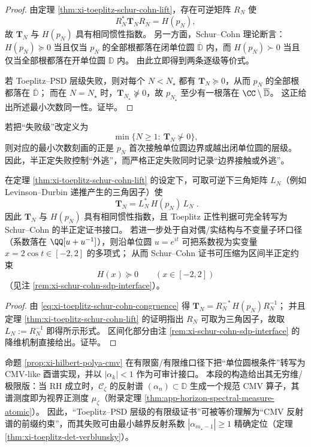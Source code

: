 \begin{proof}
由定理 \ref{thm:xi-toeplitz-schur-cohn-lift}，存在可逆矩阵 \(R_N\) 使
\[
R_N^\ast\mathbf{T}_N R_N=H(p_N),
\]
故 \(\mathbf{T}_N\) 与 \(H(p_N)\) 具有相同惯性指数。
另一方面，Schur--Cohn 理论断言：\(H(p_N)\succeq 0\) 当且仅当 \(p_N\) 的全部根都落在闭单位圆 \(\overline{\mathbb D}\) 内，而 \(H(p_N)\succ 0\) 当且仅当全部根都落在开单位圆 \(\mathbb D\) 内。
由此立即得到两条逐级等价式。

若 Toeplitz--PSD 层级失败，则对每个 \(N<N_\star\) 都有 \(\mathbf{T}_N\succeq 0\)，从而 \(p_N\) 的全部根都落在 \(\overline{\mathbb D}\)；
而在 \(N=N_\star\) 时，\(\mathbf{T}_{N_\star}\nsucceq 0\)，故 \(p_{N_\star}\) 至少有一根落在 \(\CC\setminus\overline{\mathbb D}\)。
这正给出所述最小次数同一性。证毕。
\end{proof}

\begin{remark}[边界接触与严格正定失败]\label{rem:xi-toeplitz-strict-failure-boundary-contact}
若把“失败级”改定义为
\[
\min\{N\ge 1:\ \mathbf{T}_N\not\succ 0\},
\]
则对应的最小次数刻画的正是 \(p_N\) 首次接触单位圆边界或越出闭单位圆的层级。
因此，半正定失败控制“外逃”，而严格正定失败同时记录“边界接触或外逃”。
\end{remark}

\begin{proposition}\label{prop:xi-toeplitz-interval-audit-invariant-ring}
在定理 \ref{thm:xi-toeplitz-schur-cohn-lift} 的设定下，可取可逆下三角矩阵 \(L_N\)（例如 Levinson--Durbin 递推产生的三角因子）使
\[
\boxed{\;
\mathbf{T}_N=L_N^{\ast}\,H(p_N)\,L_N\; }.
\]
因此 \(\mathbf{T}_N\) 与 \(H(p_N)\) 具有相同惯性指数，且 Toeplitz 正性判据可完全转写为 Schur--Cohn 的半正定证书接口。
若进一步处于自对偶/实结构与不变量子环口径（系数落在 \(\QQ[u+u^{-1}]\)），则沿单位圆 \(u=e^{it}\) 可把系数视为实变量 \(x=2\cos t\in[-2,2]\) 的多项式；
从而 Schur--Cohn 证书可压缩为区间半正定约束
\[
H(x)\succeq 0\qquad(x\in[-2,2])
\]
（见注 \ref{rem:xi-schur-cohn-sdp-interface}）。
\end{proposition}
\begin{proof}
由 \eqref{eq:xi-toeplitz-schur-cohn-congruence} 得
\(
\mathbf{T}_N=R_N^{-*}H(p_N)R_N^{-1}
\)；
并且定理 \ref{thm:xi-toeplitz-schur-cohn-lift} 的证明指出 \(R_N\) 可取为三角因子，故取 \(L_N:=R_N^{-1}\) 即得所示形式。
区间化部分由注 \ref{rem:xi-schur-cohn-sdp-interface} 的降维机制直接给出。证毕。
\end{proof}

\begin{remark}\label{rem:xi-verblunsky-cmv-align-finite}
命题 \ref{prop:xi-hilbert-polya-cmv} 在有限窗/有限维口径下把“单位圆根条件”转写为 CMV-like 酉谱实现，并以 \(|\alpha_k|<1\) 作为可审计接口。
本段的构造给出其无穷维/极限版：当 RH 成立时，\(\mathscr{C}_\zeta\) 的反射谱 \((\alpha_n)\subset\mathbb{D}\) 生成一个规范 CMV 算子，其谱测度即为视界正测度 \(\mu_\zeta\)（附录定理 \ref{thm:app-horizon-spectral-measure-atomic}）。
因此，“Toeplitz--PSD 层级的有限级证书”可被等价理解为“CMV 反射谱的前缀约束”，而其失败可由最小越界反射系数 \(|\alpha_{m_\star-1}|\ge 1\) 精确定位（定理 \ref{thm:xi-toeplitz-det-verblunsky}）。
\end{remark}

\endinput

